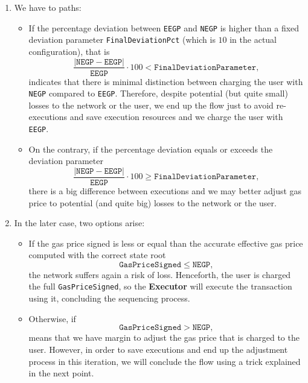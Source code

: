 \begin{enumerate}
\item We have to paths:

\begin{itemize}

\item If the percentage deviation between \texttt{EEGP} and \texttt{NEGP} is higher than a fixed deviation parameter \texttt{FinalDeviationPct} (which is $10$ in the actual configuration), that is
\[
\frac{\vert \texttt{NEGP} - \texttt{EEGP} \vert}{\texttt{EEGP}} \cdot 100 < \texttt{FinalDeviationParameter},
\]
indicates that there is minimal distinction between charging the user with \texttt{NEGP} compared to \texttt{EEGP}. Therefore, despite potential (but quite small) losses to the network or the user, we end up the flow just to avoid re-executions and save execution resources and we charge the user with \texttt{EEGP}.

\item On the contrary, if the percentage deviation equals or exceeds the deviation parameter
\[
\frac{\vert \texttt{NEGP} - \texttt{EEGP} \vert}{\texttt{EEGP}} \cdot 100 \geq \texttt{FinalDeviationParameter},
\]
there is a big difference between executions and we may better adjust gas price to potential (and quite big) losses to the network or the user.


\end{itemize}

\item In the later case, two options arise:

\begin{itemize}

\item If the gas price signed is less or equal than the accurate effective gas price computed with the correct state root
\[
\texttt{GasPriceSigned} \leq \texttt{NEGP},
\]
the network suffers again a risk of loss. Henceforth, the user is charged the full \texttt{GasPriceSigned}, so the \textbf{Executor} will execute the transaction using it, concluding the sequencing process.

\item Otherwise, if
\[
\texttt{GasPriceSigned} > \texttt{NEGP},
\]
means that we have margin to adjust the gas price that is charged to the user. However, in order to save executions and end up the adjustment process in this iteration, we will conclude the flow using a trick explained in the next point.

\end{itemize}


\end{enumerate}
